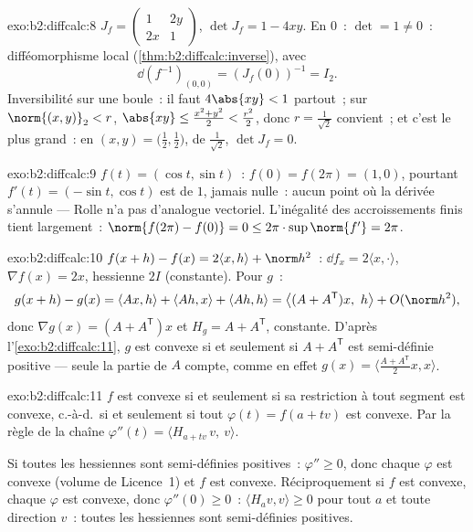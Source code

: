 \begin{solution}{exo:b2:diffcalc:8}
$J_f = \begin{pmatrix} 1 & 2y\\ 2x & 1\end{pmatrix}$, $\det J_f =
1 - 4xy$. En $0$~: $\det = 1 \neq 0$~: difféomorphisme local
(\cref{thm:b2:diffcalc:inverse}), avec
\[
\dd(f^{-1})_{(0,0)} = (J_f(0))^{-1} = I_2 .
\]
Inversibilité sur une boule~: il faut $4\abs{xy} < 1$ partout~; sur
$\norm{(x,y)}_2 < r$, $\abs{xy} \leq \frac{x^2 + y^2}{2} <
\frac{r^2}{2}$, donc $r = \frac{1}{\sqrt2}$ convient~; et c'est le
plus grand~: en $(x, y) = \bigl(\tfrac12, \tfrac12\bigr)$, de 
$\frac{1}{\sqrt2}$, $\det J_f = 0$.
\end{solution}

\begin{solution}{exo:b2:diffcalc:9}
$f(t) = (\cos t, \sin t)$~: $f(0) = f(2\pi) = (1, 0)$, pourtant $f'(t) =
(-\sin t, \cos t)$ est de  $1$, jamais nulle~: aucun point où la
dérivée s'annule --- Rolle n'a pas d'analogue vectoriel. L'inégalité
des accroissements finis tient largement~: $\norm{f(2\pi) - f(0)} = 0 \leq
2\pi \cdot \sup\norm{f'} = 2\pi$.
\end{solution}

\begin{solution}{exo:b2:diffcalc:10}
$f(x+h) - f(x) = 2\langle x, h\rangle + \norm h^2$~: $\dd f_x =
2\langle x, \cdot\rangle$, $\nabla f(x) = 2x$, hessienne $2I$
(constante). Pour $g$~:
\[
g(x + h) - g(x) = \langle Ax, h\rangle + \langle Ah, x\rangle
+ \langle Ah, h\rangle
= \bigl\langle (A + A^{\mathsf T})x,\ h\bigr\rangle +
O(\norm h^2),
\]
donc $\nabla g(x) = (A + A^{\mathsf T})x$ et $H_g = A +
A^{\mathsf T}$, constante. D'après l'\cref{exo:b2:diffcalc:11}, $g$ est
convexe si et seulement si $A + A^{\mathsf T}$ est semi-définie
positive --- seule la partie  de $A$ compte, comme en effet
$g(x) = \langle \frac{A + A^{\mathsf T}}2 x, x\rangle$.
\end{solution}

\begin{solution}{exo:b2:diffcalc:11}
$f$ est convexe si et seulement si sa restriction à tout segment est
convexe, c.-à-d.\ si et seulement si tout $\varphi(t) = f(a + tv)$ est
convexe. Par la règle de la chaîne $\varphi''(t) = \langle H_{a+tv}\,v,\
v\rangle$.

Si toutes les hessiennes sont semi-définies positives~: $\varphi'' \geq 0$,
donc chaque $\varphi$ est convexe (volume de Licence~1) et $f$ est
convexe. Réciproquement si $f$ est convexe, chaque $\varphi$ est
convexe, donc $\varphi''(0) \geq 0$~: $\langle H_a v, v\rangle \geq 0$
pour tout $a$ et toute direction $v$~: toutes les hessiennes sont
semi-définies positives.
\end{solution}

